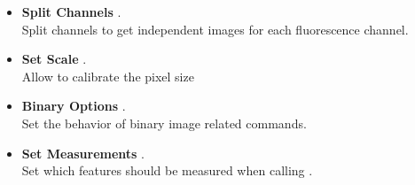 \begin{itemize}
\item \textbf{Split Channels} .\\
Split channels to get independent images for each fluorescence channel.

\item \textbf{Set Scale} .\\
Allow to calibrate the pixel size

\item \textbf{Binary Options} .\\ 
Set the behavior of binary image related commands.

\item \textbf{Set Measurements} .\\ 
Set which features should be measured when calling .
\end{itemize}

\newpage
